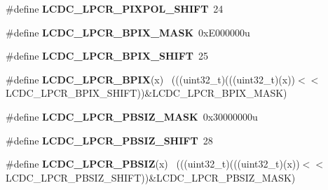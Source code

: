\begin{DoxyCompactItemize}
\item 
\hypertarget{group___l_c_d_c___register___masks_gab6c69632a7e97e743c3d039c5d14b9ea}{}\#define {\bfseries L\+C\+D\+C\+\_\+\+L\+P\+C\+R\+\_\+\+P\+I\+X\+P\+O\+L\+\_\+\+S\+H\+I\+F\+T}~24\label{group___l_c_d_c___register___masks_gab6c69632a7e97e743c3d039c5d14b9ea}

\item 
\hypertarget{group___l_c_d_c___register___masks_ga0aefca8064380ea62688e8e14c0cf6cd}{}\#define {\bfseries L\+C\+D\+C\+\_\+\+L\+P\+C\+R\+\_\+\+B\+P\+I\+X\+\_\+\+M\+A\+S\+K}~0x\+E000000u\label{group___l_c_d_c___register___masks_ga0aefca8064380ea62688e8e14c0cf6cd}

\item 
\hypertarget{group___l_c_d_c___register___masks_ga3a6ae75de419a6e2d7bb563a0b27cf95}{}\#define {\bfseries L\+C\+D\+C\+\_\+\+L\+P\+C\+R\+\_\+\+B\+P\+I\+X\+\_\+\+S\+H\+I\+F\+T}~25\label{group___l_c_d_c___register___masks_ga3a6ae75de419a6e2d7bb563a0b27cf95}

\item 
\hypertarget{group___l_c_d_c___register___masks_ga4f5f71184525730f62c077241286e7ce}{}\#define {\bfseries L\+C\+D\+C\+\_\+\+L\+P\+C\+R\+\_\+\+B\+P\+I\+X}(x)                                            ~(((uint32\+\_\+t)(((uint32\+\_\+t)(x))$<$$<$L\+C\+D\+C\+\_\+\+L\+P\+C\+R\+\_\+\+B\+P\+I\+X\+\_\+\+S\+H\+I\+F\+T))\&L\+C\+D\+C\+\_\+\+L\+P\+C\+R\+\_\+\+B\+P\+I\+X\+\_\+\+M\+A\+S\+K)\label{group___l_c_d_c___register___masks_ga4f5f71184525730f62c077241286e7ce}

\item 
\hypertarget{group___l_c_d_c___register___masks_ga074dd9daf4eb335181bc3035e592fbd6}{}\#define {\bfseries L\+C\+D\+C\+\_\+\+L\+P\+C\+R\+\_\+\+P\+B\+S\+I\+Z\+\_\+\+M\+A\+S\+K}~0x30000000u\label{group___l_c_d_c___register___masks_ga074dd9daf4eb335181bc3035e592fbd6}

\item 
\hypertarget{group___l_c_d_c___register___masks_ga7d133d35ae79d6ac29584726dab9e1a2}{}\#define {\bfseries L\+C\+D\+C\+\_\+\+L\+P\+C\+R\+\_\+\+P\+B\+S\+I\+Z\+\_\+\+S\+H\+I\+F\+T}~28\label{group___l_c_d_c___register___masks_ga7d133d35ae79d6ac29584726dab9e1a2}

\item 
\hypertarget{group___l_c_d_c___register___masks_ga161f234192a96ca450b3a4ad2833775e}{}\#define {\bfseries L\+C\+D\+C\+\_\+\+L\+P\+C\+R\+\_\+\+P\+B\+S\+I\+Z}(x)                                          ~(((uint32\+\_\+t)(((uint32\+\_\+t)(x))$<$$<$L\+C\+D\+C\+\_\+\+L\+P\+C\+R\+\_\+\+P\+B\+S\+I\+Z\+\_\+\+S\+H\+I\+F\+T))\&L\+C\+D\+C\+\_\+\+L\+P\+C\+R\+\_\+\+P\+B\+S\+I\+Z\+\_\+\+M\+A\+S\+K)\label{group___l_c_d_c___register___masks_ga161f234192a96ca450b3a4ad2833775e}


\end{DoxyCompactItemize}
